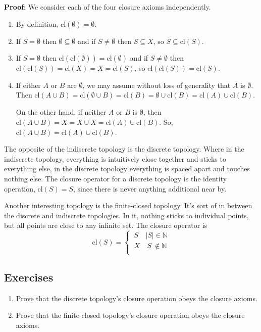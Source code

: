 \documentclass{report}
\newcommand{\cl}{\mathrm{cl}}
\begin{document}
{\bf Proof}: We consider each of the four closure axioms independently.
\begin{enumerate}
\item By definition, $\cl(∅) = ∅$.
\item If $S=∅$ then $∅ ⊆ ∅$ and if $S \neq ∅$ then $S ⊆ X$, so $S ⊆ \cl(S)$.
\item If $S=∅$ then $\cl(\cl(∅)) =  \cl(∅)$ and if $S \neq ∅$ then $\cl(\cl(S)) =  \cl(X) = X = \cl(S)$, so $\cl(\cl(S)) = \cl(S)$.
\item If either $A$ or $B$ are $∅$, we may assume without loss of generality that $A$ is $∅$. Then $\cl(A∪B) = \cl(∅∪B) = \cl(B) = ∅ ∪ \cl(B) = \cl(A) ∪ \cl(B)$. 

On the other hand, if neither $A$ or $B$ is $∅$, then $\cl(A∪B) = X = X∪X = \cl(A) ∪ \cl(B)$. So, $\cl(A∪B) =  \cl(A) ∪ \cl(B)$.
\end{enumerate}

The opposite of the indiscrete topology is the discrete topology. Where in the indiscrete topology, everything is intuitively close together and sticks to everything else, in the discrete topology everything is spaced apart and touches nothing else. The closure operator for a discrete topology is the identity operation, $\cl(S) = S$, since there is never anything additional near by.

Another interesting topology is the finite-closed topology. It's sort of in between the discrete and indiscrete topologies. In it, nothing sticks to individual points, but all points are close to any infinite set. The closure operator is $$\cl(S) = \begin{cases} ~S & |S| \in \mathbb{N}\\ ~X & ~S~ \not\in \mathbb{N}\\ \end{cases} $$

\subsection*{Exercises}

\begin{enumerate}

\item Prove that the discrete topology's closure operation obeys the closure axioms.
\item Prove that the finite-closed topology's closure operation obeys the closure axioms.
\end{enumerate}
\end{document}
